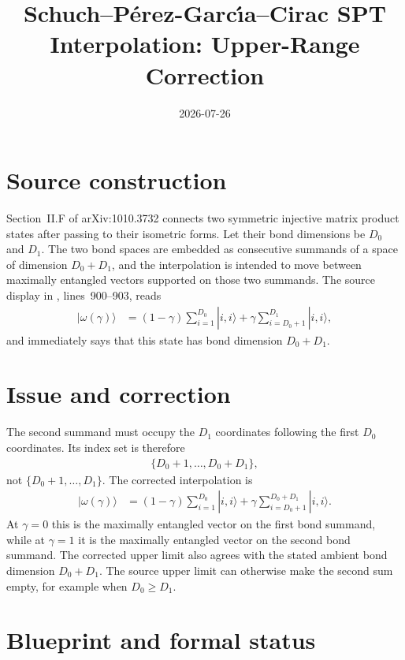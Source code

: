 \documentclass{article}
\title{Schuch--P\'erez-Garc{\'\i}a--Cirac SPT Interpolation: Upper-Range Correction}
\author{}
\date{2026-07-26}
\begin{document}
\maketitle

\section{Source construction}

Section~II.F of arXiv:1010.3732 connects two symmetric injective matrix
product states after passing to their isometric forms. Let their bond
dimensions be $D_0$ and $D_1$. The two bond spaces are embedded as consecutive
summands of a space of dimension $D_0+D_1$, and the interpolation is intended
to move between maximally entangled vectors supported on those two summands.
The source display in
, lines~900--903, reads
\begin{align}
  |\omega(\gamma)\rangle
  &=(1-\gamma)\sum_{i=1}^{D_0}|i,i\rangle +\gamma\sum_{i=D_0+1}^{D_1}|i,i\rangle,
  \tag{source display}
\end{align}
and immediately says that this state has bond dimension $D_0+D_1$.

\section{Issue and correction}

The second summand must occupy the $D_1$ coordinates following the first
$D_0$ coordinates. Its index set is therefore
\begin{align}
  \{D_0+1,\ldots,D_0+D_1\},
\end{align}
not $\{D_0+1,\ldots,D_1\}$. The corrected interpolation is
\begin{align}
  |\omega(\gamma)\rangle
  &=(1-\gamma)\sum_{i=1}^{D_0}|i,i\rangle +\gamma\sum_{i=D_0+1}^{D_0+D_1}|i,i\rangle.
  \tag{corrected interpolation}
\end{align}
At $\gamma=0$ this is the maximally entangled vector on the first bond
summand, while at $\gamma=1$ it is the maximally entangled vector on the
second bond summand. The corrected upper limit also agrees with the stated
ambient bond dimension $D_0+D_1$. The source upper limit can otherwise make
the second sum empty, for example when $D_0\geq D_1$.

\section{Blueprint and formal status}
\end{document}
